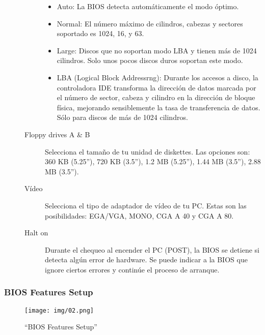 \documentclass[12pt,oneside,a4paper]{article}
\begin{document}
\begin{description}
\begin{description}
						\begin{itemize}
							\item Auto: La BIOS detecta automáticamente el modo
								óptimo.  \item Normal: El número máximo de
								cilindros, cabezas y sectores soportado es
								1024, 16, y 63.
							\item Large: Discos que no soportan modo LBA y
								tienen más de 1024 cilindros. Solo unos pocos
								discos duros soportan este modo.
							\item LBA (Logical Block Addressrng): Durante los
								accesos a disco, la controladora IDE transforma
								la dirección de datos marcada por el número de
								sector, cabeza y cilindro en la dirección de
								bloque física, mejorando sensiblemente la tasa
								de transferencia de datos. Sólo para discos de
								más de 1024 cilindros.
						\end{itemize}
					\item[Floppy drives A \& B] Selecciona el tamaño de tu
						unidad de diskettes. Las opciones son: 360 KB (5.25”),
						720 KB (3.5”), 1.2 MB (5.25”), 1.44 MB (3.5”), 2.88 MB
						(3.5”).
					\item[Vídeo] Selecciona el tipo de adaptador de
						vídeo de tu PC. Estas son las posibilidades: EGA/VGA,
						MONO, CGA A 40 y CGA A 80.
					\item[Halt on] Durante el chequeo al encender el PC (POST),
						la BIOS se detiene si detecta algún error de hardware.
						Se puede indicar a la BIOS que ignore ciertos errores y
						continúe el proceso de arranque.

					\end{description}
				\end{description}

		\subsubsection{BIOS Features Setup}{\label{sub:bios features setup}}
			\begin{figure}[H]
				\centering
					\texttt{[image: img/02.png]}
				\caption{``BIOS Features Setup''}
			\end{figure}
			
\end{document}
